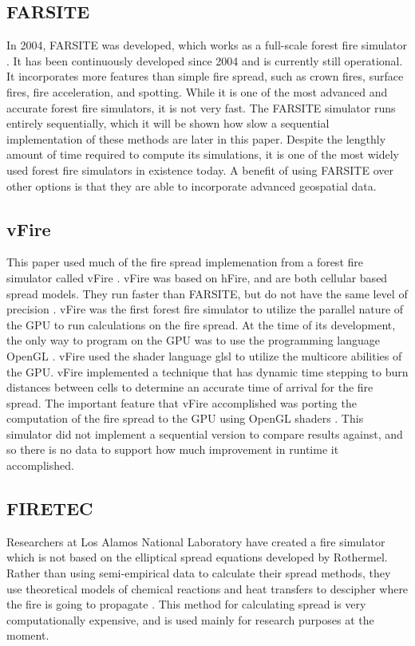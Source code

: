 \subsection{FARSITE}
In 2004, FARSITE was developed, which works as a full-scale forest fire simulator \cite{FARSITE}. It has been continuously developed since 2004 and is currently still operational. It incorporates more features than simple fire spread, such as crown fires, surface fires, fire acceleration, and spotting. While it is one of the most advanced and accurate forest fire simulators, it is not very fast. The FARSITE simulator runs entirely sequentially, which it will be shown how slow a sequential implementation of these methods are later in this paper. Despite the lengthly amount of time required to compute its simulations, it is one of the most widely used forest fire simulators in existence today. A benefit of using FARSITE over other options is that they are able to incorporate advanced geospatial data.

\subsection{vFire}
This paper used much of the fire spread implemenation from a forest fire simulator called vFire \cite{vFire}. vFire was based on hFire, and are both cellular based spread models. They run faster than FARSITE, but do not have the same level of precision \cite{hFire}. vFire was the first forest fire simulator to utilize the parallel nature of the GPU to run calculations on the fire spread. At the time of its development, the only way to program on the GPU was to use the programming language OpenGL \cite{opengl}. vFire used the shader language glsl to utilize the multicore abilities of the GPU. vFire implemented a technique that has dynamic time stepping to burn distances between cells to determine an accurate time of arrival for the fire spread. The important feature that vFire accomplished was porting the computation of the fire spread to the GPU using OpenGL shaders \cite{opengl}. This simulator did not implement a sequential version to compare results against, and so there is no data to support how much improvement in runtime it accomplished. 

\subsection{FIRETEC}
Researchers at Los Alamos National Laboratory have created a fire simulator which is not based on the elliptical spread equations developed by Rothermel. Rather than using semi-empirical data to calculate their spread methods, they use theoretical models of chemical reactions and heat transfers to descipher where the fire is going to propagate \cite{firetech}. This method for calculating spread is very computationally expensive, and is used mainly for research purposes at the moment. 

